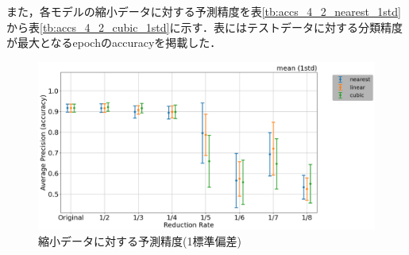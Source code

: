 \documentclass[a4j, 11pt]{jreport}
\begin{document}
また，各モデルの縮小データに対する予測精度を表\ref{tb:accs_4_2_nearest_1std}から表\ref{tb:accs_4_2_cubic_1std}に示す．表にはテストデータに対する分類精度が最大となるepochのaccuracyを掲載した．




\begin{figure}[H]
  \centering
  \includegraphics[width=1\hsize, keepaspectratio]{images/5syou/print_errorbar/print_errorbar_inter_comparison/acc_with_errorbar_syuron5_inter_comparison_900epoch_30run_300_acc_max_std1sigma.png}
  \caption{縮小データに対する予測精度(1標準偏差)}
  \label{fig:inter_comparison_300_1std}
\end{figure}
\end{document}
